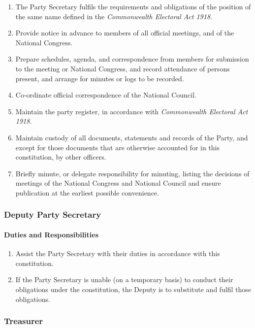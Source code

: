 \documentclass[a4paper,titlepage,8.5pt]{article}
\begin{document}
\begin{enumerate}
\item The Party Secretary fulfils the requirements and obligations of the position of the same name defined in the \textit{Commonwealth Electoral Act 1918}.
\item Provide notice in advance to members of all official meetings, and of the National Congress.
\item Prepare schedules, agenda, and correspondence from members for submission to the meeting or National Congress, and record attendance of persons present, and arrange for minutes or logs to be recorded.
\item Co-ordinate official correspondence of the National Council.
\item Maintain the party register, in accordance with \textit{Commonwealth Electoral Act 1918}.
\item Maintain custody of all documents, statements and records of the Party, and except for those documents that are otherwise accounted for in this constitution, by other officers.
\item Briefly minute, or delegate responsibility for minuting, listing the decisions of meetings of the National Congress and National Council and ensure publication at the earliest possible convenience.
\end{enumerate}

\subsubsection{Deputy Party Secretary}

\paragraph{Duties and Responsibilities}

\begin{enumerate}
\item Assist the Party Secretary with their duties in accordance with this constitution.
\item If the Party Secretary is unable (on a temporary basis) to conduct their obligations under the constitution, the Deputy is to substitute and fulfil those obligations.
\end{enumerate}

\subsubsection{Treasurer}
\end{document}
